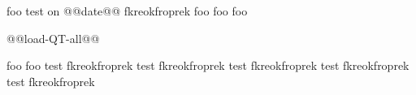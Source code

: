 foo
test on @@date@@
fkreokfroprek
foo
foo
foo

@@load-QT-all@@

foo
foo
test
fkreokfroprek
test
fkreokfroprek
test
fkreokfroprek
test
fkreokfroprek
test
fkreokfroprek
